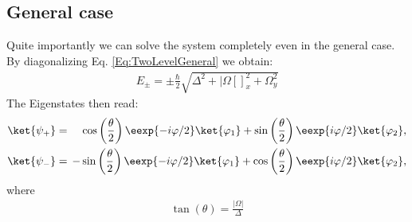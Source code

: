 \subsection{General case}

Quite importantly we can solve the system completely even in the general case. By diagonalizing  Eq. \eqref{Eq:TwoLevelGeneral} we obtain:
\begin{align}\label{eq:Epm}
 E_\pm = \pm \frac{\hbar}{2} \sqrt{\Delta^2+|\Omega[]_x^2+\Omega_y^2}
\end{align}
The Eigenstates then read:
\begin{align}
				\ket{\psi_+}&=&\hspace{-2mm}&\cos\left(\frac{\theta}{2}\right) \eexp{-i{\varphi}/{2}}\ket{\varphi_1}+\sin\left(\frac{\theta}{2}\right) \eexp{i{\varphi}/{2}}\ket{\varphi_2}, \label{eq:staticpsiplus} \\ 
				\ket{\psi_-}&=&\hspace{-2mm}-&\sin\left(\frac{\theta}{2}\right) \eexp{-i{\varphi}/{2}}\ket{\varphi_1}+\cos\left(\frac{\theta}{2}\right) \eexp{i{\varphi}/{2}}\ket{\varphi_2}, \label{eq:staticpsiminus}
\end{align}
where 
\begin{align} \label{eq:parameters}
	\tan(\theta) = \frac{|\Omega|}{\Delta} 
\end{align}
